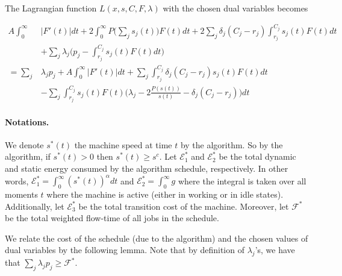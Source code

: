 \documentclass[11pt]{article}
\begin{document}
\paragraph{}
The Lagrangian function $L(x,s,C,F,\lambda)$ with the chosen dual variables becomes
 
\begin{align*}
A \int_{0}^{\infty}& |F'(t)|dt  + 2\int_{0}^{\infty} P\biggl( \sum_{j} s_{j}(t)\biggl)F(t)dt
    		+ 2 \sum_{j} \delta_{j}(C_{j} - r_{j}) \int_{r_{j}}^{C_{j}} s_{j}(t)F(t)dt \\
		&+ \sum_{j} \lambda_{j} \biggl( p_{j} - \int_{r_{j}}^{C_{j}} s_{j}(t)F(t)dt \biggl) \\
= \sum_{j} & \lambda_{j}p_{j}  +  A \int_{0}^{\infty} |F'(t)|dt 
			+ \sum_{j} \int_{r_{j}}^{C_{j}}  \delta_{j}(C_{j} - r_{j}) s_{j}(t)F(t)dt\\
		&- \sum_{j} \int_{r_{j}}^{C_{j}} s_{j}(t)F(t)
			\biggl( \lambda_{j} - 2\frac{P(s(t))}{s(t)} 
				- \delta_{j}(C_{j} - r_{j}) \biggl) dt	
\end{align*}


\paragraph{Notations.}
We denote $s^{*}(t)$ the machine speed at time $t$ by the algorithm. 
So by the algorithm, if $s^{*}(t) > 0$ then $s^{*}(t) \geq s^{c}$.
Let $\mathcal{E}^{*}_{1}$ and $\mathcal{E}^{*}_{2}$ be the total dynamic and static 
energy consumed by the algorithm schedule, respectively. 
In other words, $\mathcal{E}^{*}_{1} = \int_{0}^{\infty} (s^{*}(t))^{\alpha} dt$
and $\mathcal{E}^{*}_{2} = \int_{0}^{\infty} g$ where the integral is taken over all moments 
$t$ where the machine is active (either in working or in idle states).
Additionally, let $\mathcal{E}^{*}_{3}$ be the total transition cost of the machine.
Moreover, let $\mathcal{F}^{*}$ be the total weighted flow-time of all jobs 
in the schedule. 

We relate the cost of the schedule (due to the algorithm) and the chosen values of dual variables by the 
following lemma. Note that by definition of $\lambda_{j}$'s, we have that 
$\sum_{j} \lambda_{j}p_{j} \geq \mathcal{F}^{*}$.
\end{document}
